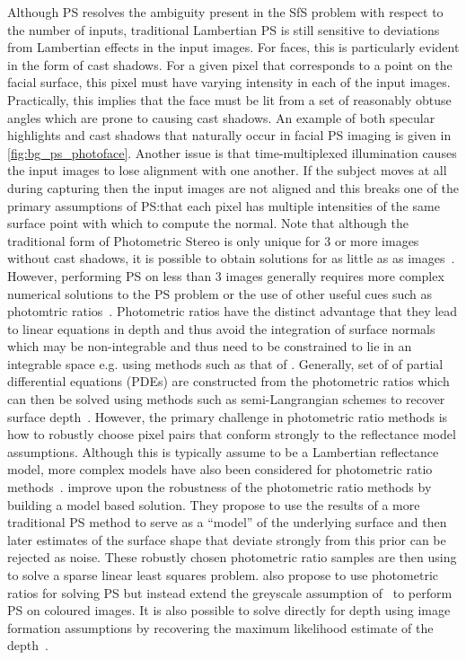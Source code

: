 Although PS resolves the ambiguity present in the SfS problem with respect
to the number of inputs, traditional Lambertian PS is still sensitive to
deviations from Lambertian effects in the input images. For faces, this
is particularly evident in the form of cast shadows. For a given pixel that
corresponds to a point on the facial surface, this pixel must have varying
intensity in each of the input images. Practically, this implies that the face
must be lit from a set of reasonably obtuse angles which are prone to causing
cast shadows. An example of both specular highlights and cast shadows that
naturally occur in facial PS imaging is given in \cref{fig:bg_ps_photoface}.
Another issue is that time-multiplexed illumination causes the input
images to lose alignment with one another. If the subject moves at all
during capturing then the input images are not aligned and this breaks
one of the primary assumptions of PS:\@ that each pixel has multiple intensities
of the same surface point with which to compute the normal.
Note that although the traditional form of Photometric Stereo is only unique
for 3 or more images without cast shadows, it is possible to obtain
solutions for as little as as
images~\cite{mecca2013uniqueness,mecca2016unifying}. However, performing PS
on less than 3 images generally requires more complex numerical solutions to the
PS problem or the use of other useful cues such as photomtric
ratios~\citet{smith2016height,queau2016unbiased,mecca2016unifying}. Photometric
ratios have the distinct advantage that they lead to linear equations in
depth and thus avoid the integration of surface normals which may be non-integrable
and thus need to be constrained to lie in an integrable space e.g. using methods
such as that of \citet{frankot1988method}. Generally, set of of partial differential
equations (PDEs) are constructed from the photometric ratios which can then
be solved using methods such as semi-Langrangian schemes to recover surface
depth~\cite{mecca2013uniqueness,mecca2016unifying}. However, the primary
challenge in photometric ratio methods is how to robustly choose pixel
pairs that conform strongly to the reflectance model assumptions. Although this
is typically assume to be a Lambertian reflectance model, more complex models
have also been considered for photometric ratio
methods~\cite{chandraker2013differential,mecca2015realistic}.
\citet{smith2016height} improve upon the robustness of the photometric ratio
methods by building a model based solution. They propose to use the results
of a more traditional PS method to serve as a ``model'' of the underlying surface
and then later estimates of the surface shape that deviate strongly from
this prior can be rejected as noise. These robustly chosen photometric
ratio samples are then using to solve a sparse linear least squares problem.
\cite{queau2016unbiased} also propose to use photometric ratios for solving
PS but instead extend the greyscale assumption of~\cite{smith2016height}
to perform PS on coloured images. It is also possible to solve directly
for depth using image formation assumptions by recovering the maximum
likelihood estimate of the depth~\cite{harrison2012maximum}.

